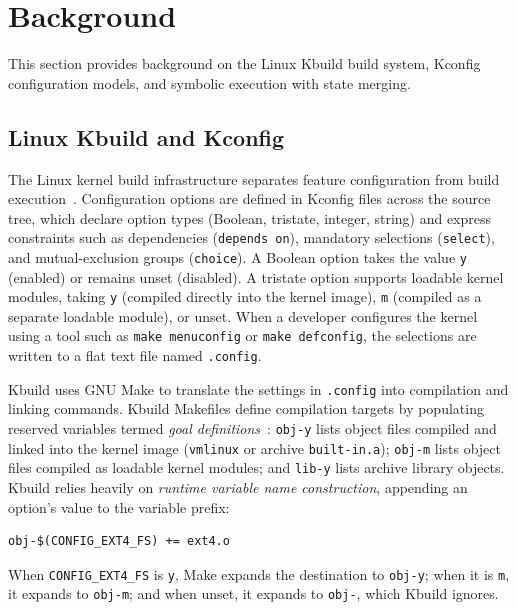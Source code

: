 \documentclass[acmsmall,screen,review,anonymous,nonacm]{acmart}
\begin{document}
\section{Background}
  \label{sec:background}
  This section provides background on the Linux Kbuild build system, Kconfig configuration models, and symbolic execution with state merging.

  \subsection{Linux Kbuild and Kconfig}
    \label{sec:background:kbuild}
    The Linux kernel build infrastructure separates feature configuration from build execution~\cite{nguyen2020kbuild}.
    Configuration options are defined in Kconfig files across the source tree, which declare option types (Boolean, tristate, integer, string) and express constraints such as dependencies (\texttt{depends on}), mandatory selections (\texttt{select}), and mutual-exclusion groups (\texttt{choice}).
    A Boolean option takes the value \texttt{y} (enabled) or remains unset (disabled).
    A tristate option supports loadable kernel modules, taking \texttt{y} (compiled directly into the kernel image), \texttt{m} (compiled as a separate loadable module), or unset.
    When a developer configures the kernel using a tool such as \texttt{make menuconfig} or \texttt{make defconfig}, the selections are written to a flat text file named \texttt{.config}.

    Kbuild uses GNU Make to translate the settings in \texttt{.config} into compilation and linking commands.
    Kbuild Makefiles define compilation targets by populating reserved variables termed \emph{goal definitions}~\cite{gazzillo2017kmax}:
    \texttt{obj-y} lists object files compiled and linked into the kernel image (\texttt{vmlinux} or archive \texttt{built-in.a});
    \texttt{obj-m} lists object files compiled as loadable kernel modules;
    and \texttt{lib-y} lists archive library objects.
    Kbuild relies heavily on \emph{runtime variable name construction}, appending an option's value to the variable prefix:
    \begin{lstlisting}[style=kbuild]
    obj-$(CONFIG_EXT4_FS) += ext4.o
    \end{lstlisting}
    When \texttt{CONFIG\_EXT4\_FS} is \texttt{y}, Make expands the destination to \texttt{obj-y}; when it is \texttt{m}, it expands to \texttt{obj-m}; and when unset, it expands to \texttt{obj-}, which Kbuild ignores.
\end{document}
